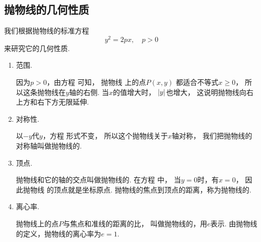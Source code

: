 \subsection{抛物线的几何性质}
我们根据抛物线的标准方程\begin{equation*}
	y^2 = 2px,
	\quad p > 0
\end{equation*}
来研究它的几何性质.
\begin{enumerate}
	\item 范围.

	因为\(p>0\)，由方程  可知，
	抛物线  上的点\(P(x,y)\)
	都适合不等式\(x \geq 0\)，
	所以这条抛物线在\(y\)轴的右侧.
	当\(x\)的值增大时，
	\(\abs{y}\)也增大，
	这说明抛物线向右上方和右下方无限延伸.

	\item 对称性.

	以\(-y\)代\(y\)，方程  形式不变，
	所以这个抛物线关于\(x\)轴对称，
	我们把抛物线的对称轴叫做抛物线的.

	\item 顶点.

	抛物线和它的轴的交点叫做抛物线的.
	在方程  中，
	当\(y=0\)时，有\(x=0\)，
	因此抛物线  的顶点就是坐标原点.
	抛物线的焦点到顶点的距离，称为抛物线的.

	\item 离心率.

	抛物线上的点\(P\)与焦点和准线的距离的比，
	叫做抛物线的，用\(e\)表示.
	由抛物线的定义，抛物线的离心率为\(e = 1\).
\end{enumerate}

